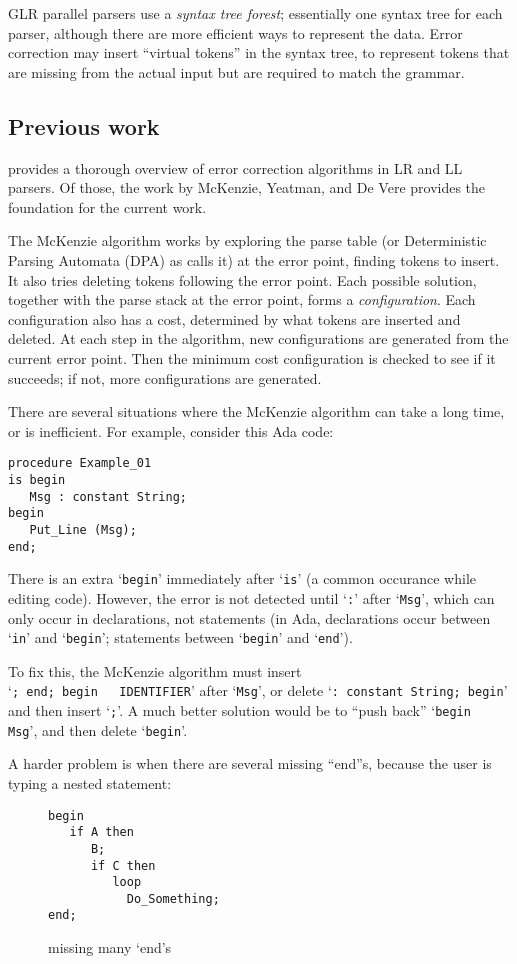 \documentclass[authordraft]{acmart}
\newcommand{\code}[1]{`\lstinline|#1|'}
\begin{document}
GLR parallel parsers use a {\it syntax tree forest}; essentially one
syntax tree for each parser, although there are more efficient ways to
represent the data. Error correction may insert ``virtual tokens'' in
the syntax tree, to represent tokens that are missing from the actual
input but are required to match the grammar.

\subsection{Previous work}
\citet{Grune_2008} provides a thorough overview of error
correction algorithms in LR and LL parsers. Of those, the work by
McKenzie, Yeatman, and De Vere \citep{McKenzie_1995} provides the
foundation for the current work.

The McKenzie algorithm works by exploring the parse table (or
Deterministic Parsing Automata (DPA) as \citet{McKenzie_1995} calls it)
at the error point, finding tokens to insert. It also tries deleting
tokens following the error point. Each possible solution, together
with the parse stack at the error point, forms a
\textit{configuration}. Each configuration also has a cost, determined
by what tokens are inserted and deleted. At each step in the
algorithm, new configurations are generated from the current error
point. Then the minimum cost configuration is checked to see if it
succeeds; if not, more configurations are generated.

There are several situations where the McKenzie algorithm can take a
long time, or is inefficient. For example, consider this Ada code:
\begin{lstlisting}
procedure Example_01
is begin
   Msg : constant String;
begin
   Put_Line (Msg);
end;
\end{lstlisting}

There is an extra \code{begin} immediately after \code{is} (a common
occurance while editing code). However, the error is not detected
until \code{:} after \code{Msg}, which can only occur in declarations,
not statements (in Ada, declarations occur between \code{in} and
\code{begin}; statements between \code{begin} and \code{end}).

To fix this, the McKenzie algorithm must insert\\ \code{; end; begin
  IDENTIFIER} after \code{Msg}, or delete \code{: constant String; begin} and then insert
\code{;}. A much better solution would be to ``push back'' \code{begin
  Msg}, and then delete \code{begin}.

A harder problem is when there are several missing ``end''s, because
the user is typing a nested statement:
\begin{figure}[H]
\begin{lstlisting}
begin
   if A then
      B;
      if C then
         loop
           Do_Something;
end;
\end{lstlisting}
\caption{missing many `end's}
\label{ex:min_com_if_if_loop}
\end{figure}
\end{document}
